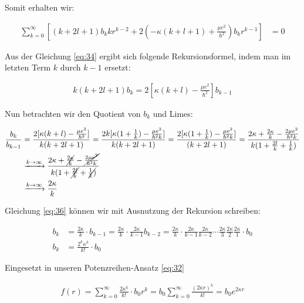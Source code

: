 Somit erhalten wir:

\begin{align}
  \label{eq:34}
   \sum^{\infty}_{k=0} \left[ (k+2l+1)b_k k r^{k-2}+ 2 \left(-\kappa(k+l+1) + \frac{\mu e^2}{\hbar^2}  \right)   b_k r^{k-1} \right]  &= 0 
\end{align}

Aus der Gleichung \eqref{eq:34} ergibt sich folgende Rekursionsformel, indem man im letzten Term \(k\) durch \(k-1\) ersetzt:

\begin{align}
  \label{eq:35}
  k(k+2l+1)b_k = 2\left[ \kappa(k+l)-\frac{\mu e^2}{\hbar^2}\right] b_{k-1}
\end{align}

Nun betrachten wir den Quotient von \(b_k\) und Limes:

\begin{align}
  \frac{b_k}{b_{k-1}} &= \frac{2[\kappa(k+l)-\frac{\mu e^2}{\hbar^2}]}{ k(k+2l+1)} 
 = \frac{2k[\kappa(1+\frac{1}{k})-\frac{\mu e^2}{\hbar^2 k}]}{ k(k+2l+1)} 
 = \frac{2[\kappa(1+\frac{1}{k})-\frac{\mu e^2}{\hbar^2 k}]}{ (k+2l+1)}
 = \frac{2\kappa+\frac{2\kappa}{k}-\frac{2\mu e^2}{\hbar^2 k}}{ k(1+\frac{2l}{k}+\frac{1}{k})}\notag\\
 &\xrightarrow{k\to \infty}  \frac{2\kappa+\cancel{\frac{2\kappa}{k}}-\cancel{\frac{2\mu e^2}{\hbar^2 k}}}{ k(1+\cancel{\frac{2l}{k}}+\cancel{\frac{1}{k})}}\notag\\
&\xrightarrow{k\to \infty}  \frac{2\kappa}{k}\label{eq:36}
\end{align}

Gleichung \eqref{eq:36} können wir mit Ausnutzung der Rekursion schreiben:

\begin{align}
  \label{eq:37}
  b_k &= \frac{2\kappa}{k}\cdot b_{k-1} = \frac{2\kappa}{k}\cdot \frac{2\kappa}{k-1} b_{k-2} = \frac{2\kappa}{k}\cdot \frac{2\kappa}{k-1} \frac{2\kappa}{k-2}\cdots \frac{2\kappa}{3}  \frac{2\kappa}{2}  \frac{2\kappa}{1} \cdot b_0 \\
b_k &=  \frac{2^k\kappa^k}{k!}\cdot b_0
\end{align}

Eingesetzt in unseren Potenzreihen-Ansatz \eqref{eq:32}

\begin{align}
  \label{eq:38}
    f(r) = \sum^{\infty}_{k=0} \frac{2\kappa^k}{k!}\cdot b_0  r^k = b_0 \sum^{\infty}_{k=0} \frac{(2\kappa r)^k}{k!} = b_0 e^{2\kappa r} 
\end{align}

